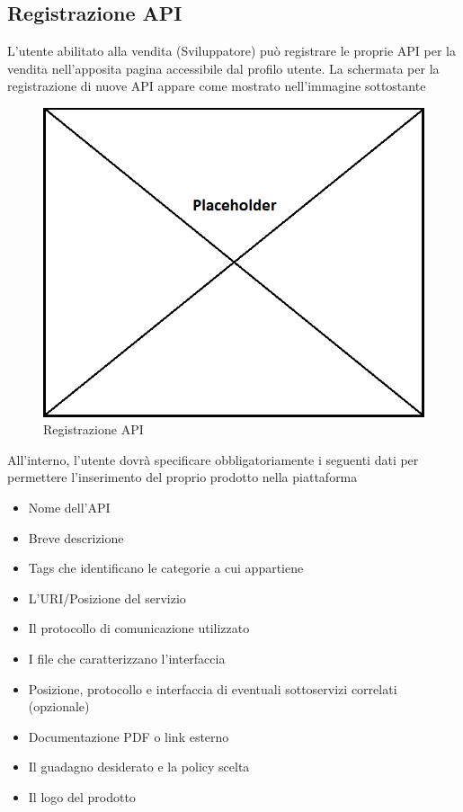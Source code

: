 \subsection{Registrazione API}

L'utente abilitato alla vendita (Sviluppatore) può  registrare le proprie API per la vendita nell'apposita pagina accessibile dal profilo utente. La schermata per la registrazione di nuove API appare come mostrato nell'immagine sottostante

\label{Registrazione API}
\begin{figure}[H]
	\centering
	\includegraphics[scale=0.45]{img/placeholder.png}
	\caption{Registrazione API}
\end{figure}

All'interno, l'utente dovrà specificare obbligatoriamente i seguenti dati per permettere l'inserimento del proprio prodotto nella piattaforma

\begin{itemize}
	\item Nome dell'API
	\item Breve descrizione
	\item Tags che identificano le categorie a cui appartiene
	\item L'URI/Posizione del servizio
	\item Il protocollo di comunicazione utilizzato
	\item I file che caratterizzano l'interfaccia
	\item Posizione, protocollo e interfaccia di eventuali sottoservizi correlati (opzionale)
	\item Documentazione PDF o link esterno
	\item Il guadagno desiderato e la policy scelta
	\item Il logo del prodotto
\end{itemize}

